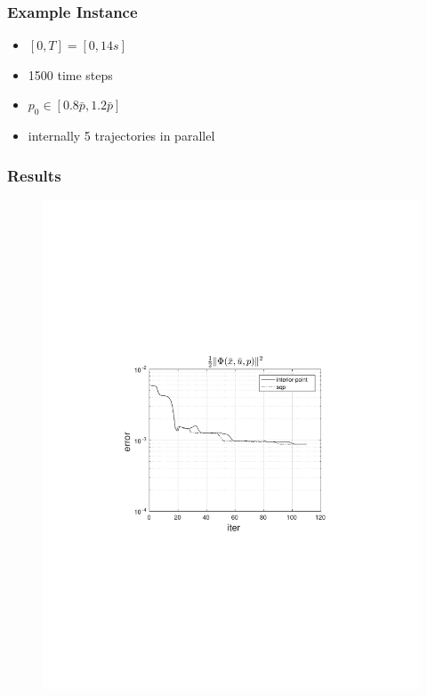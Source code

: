 \begin{frame}
    \frametitle{Example Instance}
    \begin{itemize}
        \item{$[0,T] = [0,14s]$}
        \item{1500 time steps}
        \item{$p_0 \in [0.8  \bar{p}, 1.2  \bar{p}]$}
        \item{internally 5 trajectories in parallel}
    \end{itemize}

\end{frame}

\begin{frame}
    \frametitle{Results}
    \begin{figure}
        \centering
        \includegraphics[trim=4cm 9cm 4cm 8.5cm, clip=true, width=0.6\linewidth]{img/convPlotPhi}
    \end{figure}
\end{frame}


